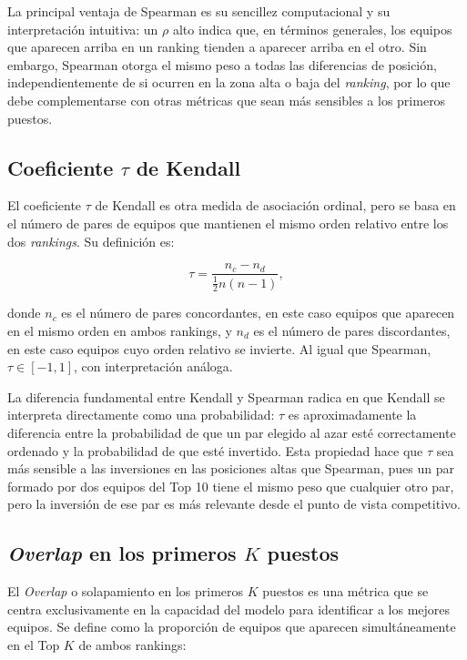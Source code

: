 La principal ventaja de Spearman es su sencillez computacional y su interpretaci\'on intuitiva: un \(\rho\) alto indica que, en t\'erminos generales, los equipos que aparecen arriba en un ranking tienden a aparecer arriba en el otro. Sin embargo, Spearman otorga el mismo peso a todas las diferencias de posici\'on, independientemente de si ocurren en la zona alta o baja del \textit{ranking}, por lo que debe complementarse con otras m\'etricas que sean m\'as sensibles a los primeros puestos.

\subsection{Coeficiente \(\tau\) de Kendall}

El coeficiente \(\tau\) de Kendall es otra medida de asociaci\'on ordinal, pero se basa en el n\'umero de pares de equipos que mantienen el mismo orden relativo entre los dos \textit{rankings}. Su definici\'on es:

\[
\tau = \frac{n_c - n_d}{\frac{1}{2}n(n-1)},
\]

donde \(n_c\) es el n\'umero de pares concordantes, en este caso equipos que aparecen en el mismo orden en ambos rankings, y \(n_d\) es el n\'umero de pares discordantes, en este caso equipos cuyo orden relativo se invierte. Al igual que Spearman, \(\tau \in [-1, 1]\), con interpretaci\'on an\'aloga.

La diferencia fundamental entre Kendall y Spearman radica en que Kendall se interpreta directamente como una probabilidad: \(\tau\) es aproximadamente la diferencia entre la probabilidad de que un par elegido al azar est\'e correctamente ordenado y la probabilidad de que est\'e invertido. Esta propiedad hace que \(\tau\) sea m\'as sensible a las inversiones en las posiciones altas que Spearman, pues un par formado por dos equipos del Top 10 tiene el mismo peso que cualquier otro par, pero la inversi\'on de ese par es m\'as relevante desde el punto de vista competitivo. 

\subsection{\textit{Overlap} en los primeros \(K\) puestos}

El \textit{Overlap} o solapamiento en los primeros \(K\) puestos es una m\'etrica que se centra exclusivamente en la capacidad del modelo para identificar a los mejores equipos. Se define como la proporci\'on de equipos que aparecen simult\'aneamente en el Top \(K\) de ambos rankings:

